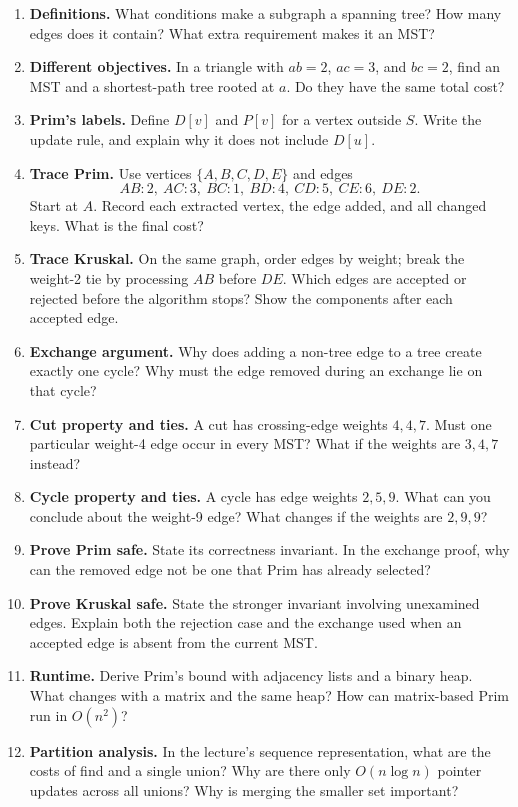 \documentclass[11pt,letterpaper]{article}
\begin{document}
\begingroup\small
\begin{enumerate}\setlength{\itemsep}{3pt}
 \item \textbf{Definitions.} What conditions make a subgraph a spanning tree? How many edges does it contain? What extra requirement makes it an MST?
 \item \textbf{Different objectives.} In a triangle with $ab=2$, $ac=3$, and $bc=2$, find an MST and a shortest-path tree rooted at $a$. Do they have the same total cost?
 \item \textbf{Prim's labels.} Define $D[v]$ and $P[v]$ for a vertex outside $S$. Write the update rule, and explain why it does not include $D[u]$.
 \item \textbf{Trace Prim.} Use vertices $\{A,B,C,D,E\}$ and edges
 \[
 AB:2,\ AC:3,\ BC:1,\ BD:4,\ CD:5,\ CE:6,\ DE:2.
 \]
 Start at $A$. Record each extracted vertex, the edge added, and all changed keys. What is the final cost?
 \item \textbf{Trace Kruskal.} On the same graph, order edges by weight; break the weight-2 tie by processing $AB$ before $DE$. Which edges are accepted or rejected before the algorithm stops? Show the components after each accepted edge.
 \item \textbf{Exchange argument.} Why does adding a non-tree edge to a tree create exactly one cycle? Why must the edge removed during an exchange lie on that cycle?
 \item \textbf{Cut property and ties.} A cut has crossing-edge weights $4,4,7$. Must one particular weight-4 edge occur in every MST? What if the weights are $3,4,7$ instead?
 \item \textbf{Cycle property and ties.} A cycle has edge weights $2,5,9$. What can you conclude about the weight-9 edge? What changes if the weights are $2,9,9$?
 \item \textbf{Prove Prim safe.} State its correctness invariant. In the exchange proof, why can the removed edge not be one that Prim has already selected?
 \item \textbf{Prove Kruskal safe.} State the stronger invariant involving unexamined edges. Explain both the rejection case and the exchange used when an accepted edge is absent from the current MST.
 \item \textbf{Runtime.} Derive Prim's bound with adjacency lists and a binary heap. What changes with a matrix and the same heap? How can matrix-based Prim run in $O(n^2)$?
 \item \textbf{Partition analysis.} In the lecture's sequence representation, what are the costs of find and a single union? Why are there only $O(n\log n)$ pointer updates across all unions? Why is merging the smaller set important?

\end{enumerate}
\end{document}
